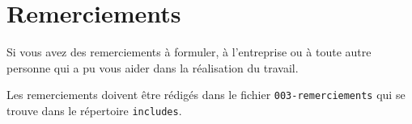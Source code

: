 

\newpage

\section*{Remerciements} %

Si vous avez des remerciements à formuler, à l’entreprise ou à toute autre personne qui a pu vous aider dans la réalisation du travail.

Les remerciements doivent être rédigés dans le fichier \texttt{003-remerciements} qui se trouve dans le répertoire \texttt{includes}.



